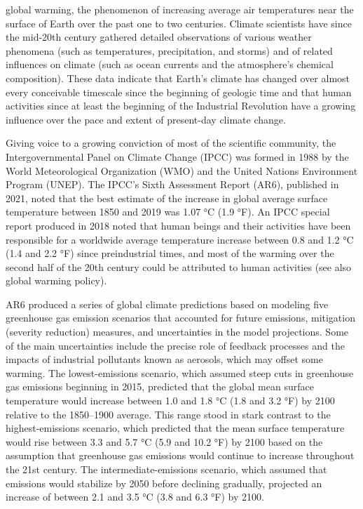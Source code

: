 global warming, the phenomenon of increasing average air temperatures near the surface of Earth over the past one to two centuries. Climate scientists have since the mid-20th century gathered detailed observations of various weather phenomena (such as temperatures, precipitation, and storms) and of related influences on climate (such as ocean currents and the atmosphere’s chemical composition). These data indicate that Earth’s climate has changed over almost every conceivable timescale since the beginning of geologic time and that human activities since at least the beginning of the Industrial Revolution have a growing influence over the pace and extent of present-day climate change.

Giving voice to a growing conviction of most of the scientific community, the Intergovernmental Panel on Climate Change (IPCC) was formed in 1988 by the World Meteorological Organization (WMO) and the United Nations Environment Program (UNEP). The IPCC’s Sixth Assessment Report (AR6), published in 2021, noted that the best estimate of the increase in global average surface temperature between 1850 and 2019 was 1.07 °C (1.9 °F). An IPCC special report produced in 2018 noted that human beings and their activities have been responsible for a worldwide average temperature increase between 0.8 and 1.2 °C (1.4 and 2.2 °F) since preindustrial times, and most of the warming over the second half of the 20th century could be attributed to human activities (see also global warming policy).


AR6 produced a series of global climate predictions based on modeling five greenhouse gas emission scenarios that accounted for future emissions, mitigation (severity reduction) measures, and uncertainties in the model projections. Some of the main uncertainties include the precise role of feedback processes and the impacts of industrial pollutants known as aerosols, which may offset some warming. The lowest-emissions scenario, which assumed steep cuts in greenhouse gas emissions beginning in 2015, predicted that the global mean surface temperature would increase between 1.0 and 1.8 °C (1.8 and 3.2 °F) by 2100 relative to the 1850–1900 average. This range stood in stark contrast to the highest-emissions scenario, which predicted that the mean surface temperature would rise between 3.3 and 5.7 °C (5.9 and 10.2 °F) by 2100 based on the assumption that greenhouse gas emissions would continue to increase throughout the 21st century. The intermediate-emissions scenario, which assumed that emissions would stabilize by 2050 before declining gradually, projected an increase of between 2.1 and 3.5 °C (3.8 and 6.3 °F) by 2100.


